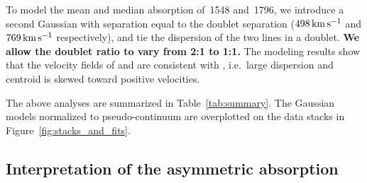 \documentclass[iop]{emulateapj}
\begin{document}
To model the mean and median absorption of \,1548 and \,1796, we introduce a  
second Gaussian with separation equal to the doublet separation ($498\,{\rm km\,s^{-1}}$ and 
$769\,{\rm km\,s^{-1}}$ respectively), and tie the dispersion of the two lines in a doublet. {\bf We
allow the doublet ratio to vary from 2:1 to 1:1.} The modeling results show that the velocity fields
of  and  are consistent with , i.e.\ large dispersion and centroid
is skewed toward positive velocities.

The above analyses are summarized in Table~\ref{tab:summary}. The Gaussian models normalized to 
pseudo-continuum are overplotted on the data stacks in Figure~\ref{fig:stacks_and_fits}. 

%


\subsection{Interpretation of the asymmetric absorption}
\label{sec:significance_+ve}
\end{document}
